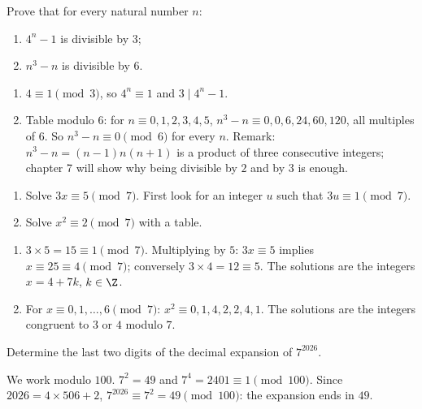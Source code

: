 \begin{exercise}
Prove that for every natural number $n$:
\begin{enumerate}
\item $4^n-1$ is divisible by $3$;
\item $n^3-n$ is divisible by $6$.
\end{enumerate}
\end{exercise}
\begin{solution}
\begin{enumerate}
\item $4\equiv1\pmod3$, so $4^n\equiv1$ and $3\mid4^n-1$.
\item Table modulo $6$: for $n\equiv0,1,2,3,4,5$, $n^3-n\equiv0,0,6,24,60,120$, all multiples of $6$. So $n^3-n\equiv0\pmod6$ for every $n$. Remark: $n^3-n=(n-1)n(n+1)$ is a product of three consecutive integers; chapter 7 will show why being divisible by $2$ and by $3$ is enough.
\end{enumerate}
\end{solution}

\begin{exercise}
\begin{enumerate}
\item Solve $3x\equiv5\pmod7$. First look for an integer $u$ such that $3u\equiv1\pmod7$.
\item Solve $x^2\equiv2\pmod7$ with a table.
\end{enumerate}
\end{exercise}
\begin{solution}
\begin{enumerate}
\item $3\times5=15\equiv1\pmod7$. Multiplying by $5$: $3x\equiv5$ implies $x\equiv25\equiv4\pmod7$; conversely $3\times4=12\equiv5$. The solutions are the integers $x=4+7k$, $k\in\Z$.
\item For $x\equiv0,1,\dots,6\pmod7$: $x^2\equiv0,1,4,2,2,4,1$. The solutions are the integers congruent to $3$ or $4$ modulo $7$.
\end{enumerate}
\end{solution}

\begin{exercise}
Determine the last two digits of the decimal expansion of $7^{2026}$.
\end{exercise}
\begin{solution}
We work modulo $100$. $7^2=49$ and $7^4=\num{2401}\equiv1\pmod{100}$. Since $\num{2026}=4\times506+2$, $7^{2026}\equiv7^2=49\pmod{100}$: the expansion ends in $49$.
\end{solution}

